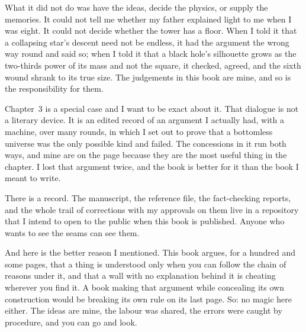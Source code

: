 What it did not do was have the ideas, decide the physics, or supply the memories. It could not tell me whether my father explained light to me when I was eight. It could not decide whether the tower has a floor. When I told it that a collapsing star's descent need not be endless, it had the argument the wrong way round and said so; when I told it that a black hole's silhouette grows as the two-thirds power of its mass and not the square, it checked, agreed, and the sixth wound shrank to its true size. The judgements in this book are mine, and so is the responsibility for them.

Chapter~3 is a special case and I want to be exact about it. That dialogue is not a literary device. It is an edited record of an argument I actually had, with a machine, over many rounds, in which I set out to prove that a bottomless universe was the only possible kind and failed. The concessions in it run both ways, and mine are on the page because they are the most useful thing in the chapter. I lost that argument twice, and the book is better for it than the book I meant to write.

There is a record. The manuscript, the reference file, the fact-checking reports, and the whole trail of corrections with my approvals on them live in a repository that I intend to open to the public when this book is published. Anyone who wants to see the seams can see them.

And here is the better reason I mentioned. This book argues, for a hundred and some pages, that a thing is understood only when you can follow the chain of reasons under it, and that a wall with no explanation behind it is cheating wherever you find it. A book making that argument while concealing its own construction would be breaking its own rule on its last page. So: no magic here either. The ideas are mine, the labour was shared, the errors were caught by procedure, and you can go and look.

